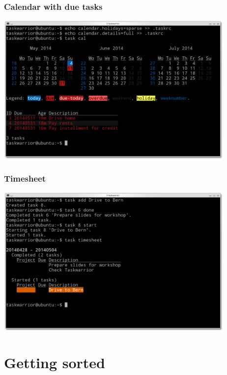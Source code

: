 \documentclass[t,handout]{beamer}
\begin{document}
\begin{frame}[fragile]\frametitle{Calendar with due tasks}
\begin{center} %
\includegraphics[width=11.8cm,height=7.5cm]{calendar-with-due-tasks.png}
\end{center}
\end{frame}

\begin{frame}[fragile]\frametitle{Timesheet}
\begin{center} %
\includegraphics[width=11.8cm,height=7.5cm]{timesheet.png}
\end{center}
\end{frame}

\section{Getting sorted}
\end{document}
